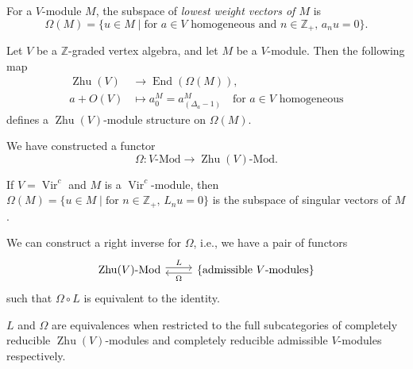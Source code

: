 \documentclass{beamer}
\DeclareMathOperator{\Vir}{Vir}
\DeclareMathOperator{\End}{End}
\DeclareMathOperator{\Zhu}{Zhu}
\begin{document}
\begin{frame}

  For a $V$-module $M$, the subspace of \emph{lowest weight vectors of $M$} is
  \begin{equation*}
    \Omega(M) = \{u \in M \mid \text{for $a \in V$ homogeneous and $n \in \mathbb{Z}_+$, $a_nu = 0$}\}.
  \end{equation*}

  \begin{theorem}
    \label{thr:4}
    Let $V$ be a $\mathbb{Z}$-graded vertex algebra, and let $M$ be a $V$-module.
    Then the following map
    \begin{align*}
      \Zhu(V) &\to \End(\Omega(M)), \\
      a + O(V) &\mapsto a^M_0 = a^M_{(\Delta_a - 1)} \quad \text{for $a \in V$ homogeneous}
    \end{align*}
    defines a $\Zhu(V)$-module structure on $\Omega(M)$.
  \end{theorem}

  We have constructed a functor
  \begin{equation*}
    \Omega: \text{$V$-Mod} \to \text{$\Zhu(V)$-Mod}.
  \end{equation*}

\end{frame}

\begin{frame}[fragile]

  \begin{example}
    \label{exa:5}
    If $V = \Vir^c$ and $M$ is a $\Vir^c$-module, then $\Omega(M) = \{u \in M \mid \text{for $n \in \mathbb{Z}_+$, $L_nu = 0$}\}$ is the subspace of singular vectors of $M$.
  \end{example}

  We can construct a right inverse for $\Omega$, i.e., we have a pair of functors
  \begin{equation*}
    \begin{tikzcd}
      \text{$\Zhu(V)$-Mod} \arrow[r, "L", shift left] & \{\text{admissible $V$-modules}\} \arrow[l, "\Omega", shift left]
    \end{tikzcd}
  \end{equation*}
  such that $\Omega\circ L$ is equivalent to the identity.

  \begin{theorem}
    \label{thr:5}
    $L$ and $\Omega$ are equivalences when restricted to the full subcategories of completely reducible $\Zhu(V)$-modules and completely reducible admissible $V$-modules respectively.
  \end{theorem}

\end{frame}
\end{document}
